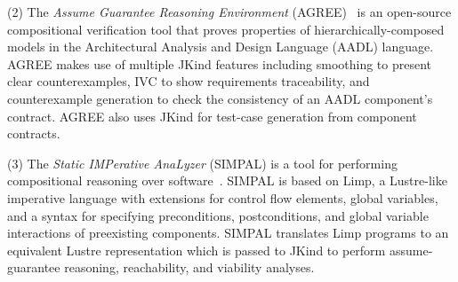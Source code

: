 \documentclass{llncs}
\newcommand{\jkind}{{\sc JKind}\xspace}
\newcommand{\lustre}{{\sc Lustre}\xspace}
\newcommand{\simpal}{{\sc SIMPAL}\xspace}
\newcommand{\limp}{{\sc Limp}\xspace}
\newcommand{\agree}{{\sc AGREE}\xspace}
\renewcommand{\paragraph}[1]{\vspace{5pt}\noindent {\bf #1}}
\newcommand{\application}[2]{
  \paragraph{#1} \hfill {\it #2}
  \vspace{1pt}
}
\begin{document}
(2) The {\em Assume Guarantee Reasoning Environment} (\agree)~\cite{cofer2012nfm,QFCS15:backes,hilt2013} is an open-source compositional verification tool that proves properties of hierarchically-composed models in the Architectural Analysis and Design Language (AADL) language.  %
%
%
%
\agree makes use of multiple \jkind features including smoothing to
present clear counterexamples, IVC to show requirements traceability,
and counterexample generation to check the consistency of an AADL
component's contract. \agree also uses \jkind for test-case generation
from component contracts.

(3) The {\em Static IMPerative AnaLyzer} (\simpal) is a tool for
performing compositional reasoning over
software~\cite{wagner2017spin}. \simpal is based on \limp, a \lustre-like imperative language with extensions for control flow elements, global variables, and a syntax for specifying preconditions, postconditions, and global variable interactions of
preexisting components. \simpal translates \limp programs to an
equivalent \lustre representation which is passed to \jkind to
perform assume-guarantee reasoning, reachability, and viability
analyses.
\end{document}
